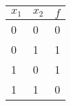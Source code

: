 \begin{tabular}{ll|l}
\multicolumn{1}{c}{$x_1$} & \multicolumn{1}{c|}{$x_2$} & \multicolumn{1}{c}{$f$} \\ \hline
0                      & 0                      & 0                     \\
0                      & 1                      & 1                     \\
1                      & 0                      & 1                     \\
1                      & 1                      & 0                    
\end{tabular}